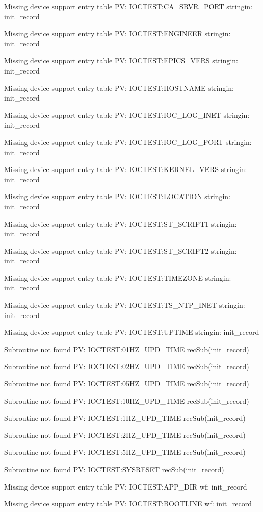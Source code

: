 Missing device support entry table PV: IOCTEST:CA_SRVR_PORT stringin: init_record

Missing device support entry table PV: IOCTEST:ENGINEER stringin: init_record

Missing device support entry table PV: IOCTEST:EPICS_VERS stringin: init_record

Missing device support entry table PV: IOCTEST:HOSTNAME stringin: init_record

Missing device support entry table PV: IOCTEST:IOC_LOG_INET stringin: init_record

Missing device support entry table PV: IOCTEST:IOC_LOG_PORT stringin: init_record

Missing device support entry table PV: IOCTEST:KERNEL_VERS stringin: init_record

Missing device support entry table PV: IOCTEST:LOCATION stringin: init_record

Missing device support entry table PV: IOCTEST:ST_SCRIPT1 stringin: init_record

Missing device support entry table PV: IOCTEST:ST_SCRIPT2 stringin: init_record

Missing device support entry table PV: IOCTEST:TIMEZONE stringin: init_record

Missing device support entry table PV: IOCTEST:TS_NTP_INET stringin: init_record

Missing device support entry table PV: IOCTEST:UPTIME stringin: init_record

Subroutine not found PV: IOCTEST:01HZ_UPD_TIME recSub(init_record)

Subroutine not found PV: IOCTEST:02HZ_UPD_TIME recSub(init_record)

Subroutine not found PV: IOCTEST:05HZ_UPD_TIME recSub(init_record)

Subroutine not found PV: IOCTEST:10HZ_UPD_TIME recSub(init_record)

Subroutine not found PV: IOCTEST:1HZ_UPD_TIME recSub(init_record)

Subroutine not found PV: IOCTEST:2HZ_UPD_TIME recSub(init_record)

Subroutine not found PV: IOCTEST:5HZ_UPD_TIME recSub(init_record)

Subroutine not found PV: IOCTEST:SYSRESET recSub(init_record)

Missing device support entry table PV: IOCTEST:APP_DIR wf: init_record

Missing device support entry table PV: IOCTEST:BOOTLINE wf: init_record


